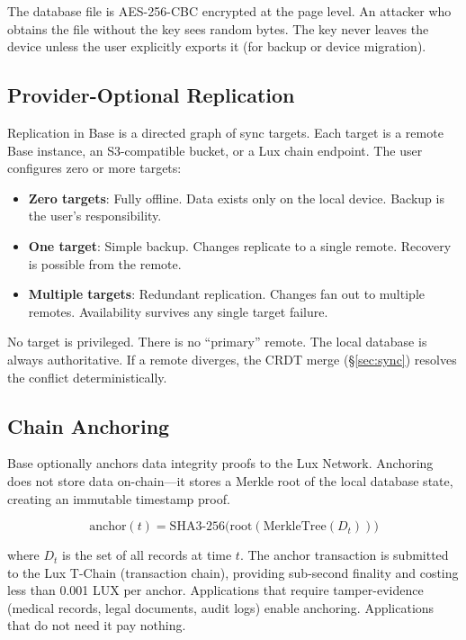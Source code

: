 \documentclass[11pt]{article}
\begin{document}
The database file is AES-256-CBC encrypted at the page level. An attacker who
obtains the file without the key sees random bytes. The key never leaves the
device unless the user explicitly exports it (for backup or device migration).

\subsection{Provider-Optional Replication}

Replication in Base is a directed graph of sync targets. Each target is a
remote Base instance, an S3-compatible bucket, or a Lux chain endpoint. The
user configures zero or more targets:

\begin{itemize}[leftmargin=1.1em]
    \item \textbf{Zero targets}: Fully offline. Data exists only on the local
    device. Backup is the user's responsibility.
    \item \textbf{One target}: Simple backup. Changes replicate to a single
    remote. Recovery is possible from the remote.
    \item \textbf{Multiple targets}: Redundant replication. Changes fan out to
    multiple remotes. Availability survives any single target failure.
\end{itemize}

No target is privileged. There is no ``primary'' remote. The local database
is always authoritative. If a remote diverges, the CRDT merge
(\S\ref{sec:sync}) resolves the conflict deterministically.

\subsection{Chain Anchoring}

Base optionally anchors data integrity proofs to the Lux Network. Anchoring
does not store data on-chain---it stores a Merkle root of the local database
state, creating an immutable timestamp proof.

\begin{equation}
\text{anchor}(t) = \text{SHA3-256}\bigl(\text{root}(\text{MerkleTree}(D_t))\bigr)
\end{equation}

where $D_t$ is the set of all records at time $t$. The anchor transaction is
submitted to the Lux T-Chain (transaction chain), providing sub-second
finality and costing less than 0.001 LUX per anchor. Applications that require
tamper-evidence (medical records, legal documents, audit logs) enable anchoring.
Applications that do not need it pay nothing.
\end{document}

